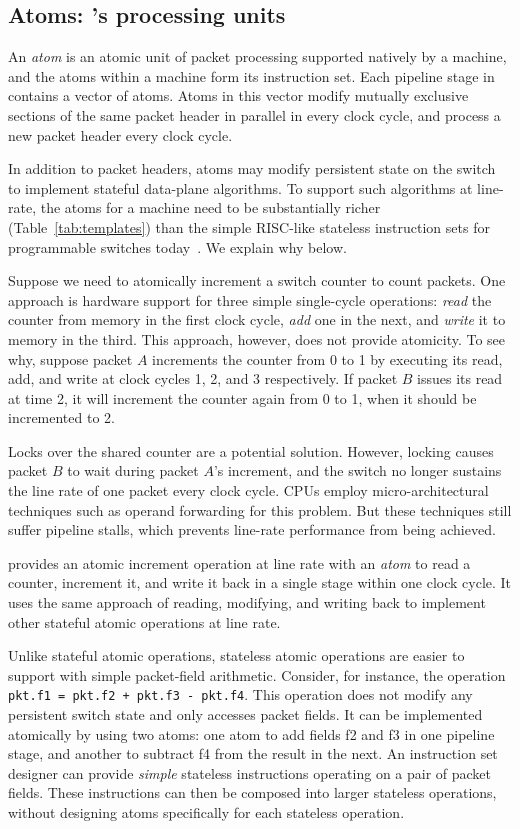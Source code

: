 \subsection{Atoms: \absmachine's processing units}
\label{ss:atoms}
 An {\em atom} is an atomic unit of packet processing supported natively by a
\absmachine machine, and the atoms within a \absmachine machine form its
instruction set. Each pipeline stage in \absmachine contains a vector of atoms.
Atoms in this vector modify mutually exclusive sections of the same packet
header in parallel in every clock cycle, and process a new packet header every
clock cycle.

In addition to packet headers, atoms may modify persistent state on the switch
to implement stateful data-plane algorithms. To support such algorithms at
line-rate, the atoms for a \absmachine machine need to be substantially richer
(Table~\ref{tab:templates}) than the simple RISC-like stateless instruction
sets for programmable switches today~\cite{rmt}. We explain why below.

Suppose we need to atomically increment a switch counter to count packets. One
approach is hardware support for three simple single-cycle operations:
\textit{read} the counter from memory in the first clock cycle, \textit{add}
one in the next, and \textit{write} it to memory in the third.  This approach,
however, does not provide atomicity. To see why, suppose packet $A$ increments
the counter from 0 to 1 by executing its read, add, and write at clock cycles
1, 2, and 3 respectively.  If packet $B$ issues its read at time 2, it will
increment the counter again from 0 to 1, when it should be incremented to 2.

Locks over the shared counter are a potential solution.  However, locking
causes packet $B$ to wait during packet $A$'s increment, and the switch no
longer sustains the line rate of one packet every clock cycle. CPUs employ
micro-architectural techniques such as operand forwarding for this
problem. But these techniques still suffer pipeline stalls, which prevents
line-rate performance from being achieved.

\absmachine provides an atomic increment operation at line rate with an {\em
atom} to read a counter, increment it, and write it back in a single stage within
one clock cycle. It uses the same approach of reading, modifying, and writing
back to implement other stateful atomic operations at line rate.

Unlike stateful atomic operations, stateless atomic operations are easier to
support with simple packet-field arithmetic.  Consider, for
instance, the operation {\tt pkt.f1 = pkt.f2 + pkt.f3 - pkt.f4}.  This
operation does not modify any persistent switch state and only accesses packet
fields. It can be implemented atomically by using two atoms: one atom to add
fields f2 and f3 in one pipeline stage, and another to subtract f4 from the
result in the next. An instruction set designer can provide {\em simple}
stateless instructions operating on a pair of packet fields. These instructions can then be
composed into larger stateless operations, without designing atoms specifically
for each stateless operation.

